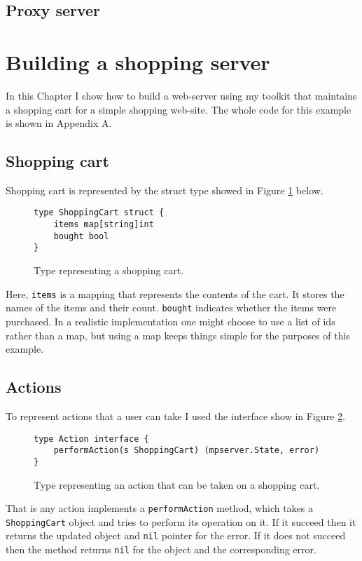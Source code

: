 \documentclass[12pt,a4paper]{article}
\begin{document}
\newpage
\subsection{Proxy server}


\newpage
\section{Building a shopping server}
\label{sec:shopping}
In this Chapter I show how to build a web-server using my toolkit that
maintains a shopping cart for a simple shopping web-site. The whole 
code for this example is shown in Appendix A.

\subsection{Shopping cart}
Shopping cart is represented by the struct type showed in Figure 
\ref{fig:shoppingCart} below.
\begin{figure}[h]
\begin{lstlisting}
type ShoppingCart struct {
    items map[string]int
    bought bool
}
\end{lstlisting}
\caption[scale=1.0]{Type representing a shopping cart.}
\label{fig:shoppingCart}
\end{figure}

Here, \texttt{items} is 
a mapping that represents the contents of the cart. It stores the names
of the items and their count. \texttt{bought} indicates whether the items
were purchased. In a realistic implementation one might choose to use 
a list of ids rather than a map, but using a map keeps things simple
for the purposes of this example.

\subsection{Actions}
To represent actions that a user can take I used the interface show in 
Figure \ref{fig:action}.
\begin{figure}[h]
\begin{lstlisting}
type Action interface {
    performAction(s ShoppingCart) (mpserver.State, error)
}
\end{lstlisting}
\caption[scale=1.0]{Type representing an action that can be taken on 
a shopping cart.}
\label{fig:action}
\end{figure}
That is any action implements a \texttt{performAction} method, which takes
a \texttt{ShoppingCart} object and tries to perform its operation on it. If
it succeed then it returns the updated object and \texttt{nil} pointer for the
error. If it does not succeed then the method returns \texttt{nil} for the
object and the corresponding error.
\end{document}
